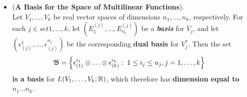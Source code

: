 \documentclass[11pt]{article}
\begin{document}
\begin{itemize}
\item 
\begin{proposition} (\textbf{A Basis for the Space of Multilinear Functions}). \\
Let $V_1,\ldots,V_k$ be real vector spaces of dimensions $n_1, \ldots, n_k$, respectively. For each $j \in set{1,\ldots,k}$, let $(E_1^{(j)},\ldots, E_{n_j}^{(j)})$ be a \emph{\textbf{basis}} for $V_j$, and let $(\epsilon_{(j)}^{1}, \ldots, \epsilon_{(j)}^{n_j})$ be the corresponding \textbf{dual basis} for $V_j^{*}$. Then the set
\begin{align*}
\mathfrak{B} &=\left\{\epsilon_{(1)}^{i_1} \otimes \ldots \otimes \epsilon_{(k)}^{i_k}: \; 1 \le i_j \le n_j, j=1,\ldots, k\right\}
\end{align*}
\textbf{is a basis} for $L(V_1,\ldots,V_k ; {\mathbb R})$, which therefore has \textbf{dimension equal to} $n_1 \ldots  n_k$.
\end{proposition}
\end{itemize}
\end{document}
